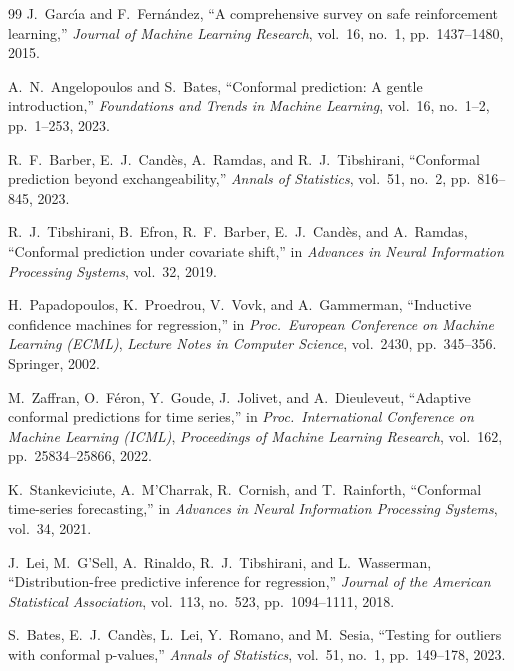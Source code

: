 \begin{thebibliography}{99}
J.~Garc\'{\i}a and F.~Fern\'{a}ndez,
``A comprehensive survey on safe reinforcement learning,''
\emph{Journal of Machine Learning Research}, vol.~16, no.~1, pp.~1437--1480, 2015.


A.~N.~Angelopoulos and S.~Bates,
``Conformal prediction: A gentle introduction,''
\emph{Foundations and Trends in Machine Learning}, vol.~16, no.~1--2, pp.~1--253, 2023.

R.~F.~Barber, E.~J.~Cand\`{e}s, A.~Ramdas, and R.~J.~Tibshirani,
``Conformal prediction beyond exchangeability,''
\emph{Annals of Statistics}, vol.~51, no.~2, pp.~816--845, 2023.

R.~J.~Tibshirani, B.~Efron, R.~F.~Barber, E.~J.~Cand\`{e}s, and A.~Ramdas,
``Conformal prediction under covariate shift,''
in \emph{Advances in Neural Information Processing Systems}, vol.~32, 2019.

H.~Papadopoulos, K.~Proedrou, V.~Vovk, and A.~Gammerman,
``Inductive confidence machines for regression,''
in \emph{Proc.\ European Conference on Machine Learning (ECML)},
\emph{Lecture Notes in Computer Science}, vol.~2430, pp.~345--356. Springer, 2002.

M.~Zaffran, O.~F\'{e}ron, Y.~Goude, J.~Jolivet, and A.~Dieuleveut,
``Adaptive conformal predictions for time series,''
in \emph{Proc.\ International Conference on Machine Learning (ICML)},
\emph{Proceedings of Machine Learning Research}, vol.~162, pp.~25834--25866, 2022.

K.~Stankeviciute, A.~M'Charrak, R.~Cornish, and T.~Rainforth,
``Conformal time-series forecasting,''
in \emph{Advances in Neural Information Processing Systems}, vol.~34, 2021.

J.~Lei, M.~G'Sell, A.~Rinaldo, R.~J.~Tibshirani, and L.~Wasserman,
``Distribution-free predictive inference for regression,''
\emph{Journal of the American Statistical Association}, vol.~113, no.~523,
pp.~1094--1111, 2018.

S.~Bates, E.~J.~Cand\`{e}s, L.~Lei, Y.~Romano, and M.~Sesia,
``Testing for outliers with conformal p-values,''
\emph{Annals of Statistics}, vol.~51, no.~1, pp.~149--178, 2023.


\end{thebibliography}

